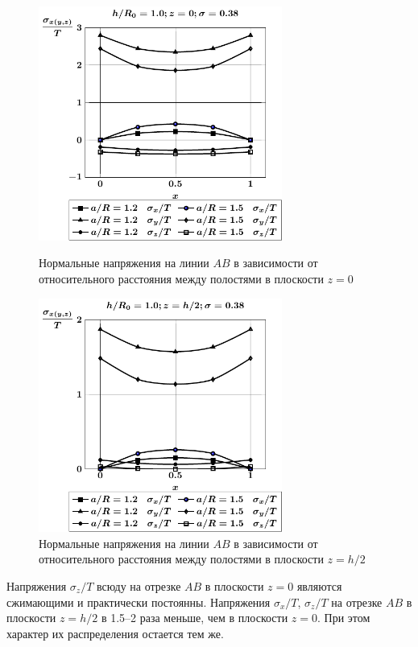 \begin{figure}[h!]
\centering\footnotesize
\parbox[b]{7.5cm}{\centering\includegraphics[width=8cm]{cav31-a-h10-r10-z0.pdf}
\caption{Нормальные напряжения на линии $AB$ в зависимости от относительного расстояния между полостями в плоскости $z=0$
\label{f:7:134}}}\hfil\hfil
\parbox[b]{7.5cm}{\centering\includegraphics[width=8cm]{cav31-a-h10-r10-z1.pdf}
\caption{Нормальные напряжения на линии $AB$ в зависимости от относительного расстояния между полостями в плоскости $z=h/2$
\label{f:7:135}}}
\end{figure}

Напряжения $\sigma_z/T$ всюду на отрезке $AB$ в плоскости $z=0$ являются сжимающими и практически постоянны. Напряжения $\sigma_x/T$, $\sigma_z/T$ на отрезке $AB$ в плоскости $z=h/2$ в 1.5--2 раза меньше, чем в плоскости $z=0$. При этом характер их распределения остается тем же.

